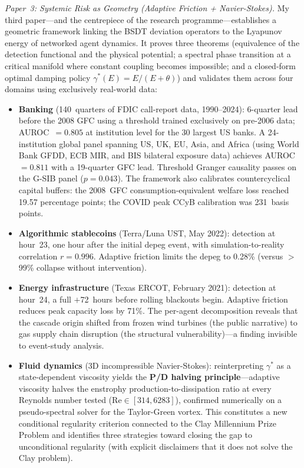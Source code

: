 \documentclass[12pt,a4paper]{article}
\begin{document}
\textit{Paper~3: Systemic Risk as Geometry (Adaptive Friction + Navier-Stokes).}\;
My third paper---and the centrepiece of the research programme---establishes
a geometric framework linking the BSDT deviation operators to the
Lyapunov energy of networked agent dynamics.  It proves three theorems
(equivalence of the detection functional and the physical potential;
a spectral phase transition at a critical manifold where constant
coupling becomes impossible; and a closed-form optimal damping policy
$\gamma^*(E) = E/(E+\theta)$) and validates them across four domains
using exclusively real-world data:

\begin{itemize}[nosep, leftmargin=2em]
  \item \textbf{Banking} (140~quarters of FDIC call-report data, 1990--2024):
    6-quarter lead before the 2008 GFC using a threshold trained
    exclusively on pre-2006 data; AUROC~$= 0.805$ at institution level
    for the 30 largest US banks.
    A 24-institution global panel spanning US, UK, EU, Asia, and Africa
    (using World Bank GFDD, ECB MIR, and BIS bilateral exposure data)
    achieves AUROC~$= 0.811$ with a 19-quarter GFC lead.  Threshold
    Granger causality passes on the G-SIB panel ($p = 0.043$).
    The framework also calibrates countercyclical capital buffers:
    the 2008~GFC consumption-equivalent welfare loss reached 19.57
    percentage points; the COVID peak CCyB calibration was 231~basis
    points.

  \item \textbf{Algorithmic stablecoins} (Terra/Luna UST, May 2022):
    detection at hour~23, one hour after the initial depeg event,
    with simulation-to-reality correlation $r = 0.996$.  Adaptive
    friction limits the depeg to 0.28\% (versus $>$99\% collapse
    without intervention).

  \item \textbf{Energy infrastructure} (Texas ERCOT, February 2021):
    detection at hour~24, a full $+$72~hours before rolling blackouts
    begin.  Adaptive friction reduces peak capacity loss by 71\%.
    The per-agent decomposition reveals that the cascade origin shifted
    from frozen wind turbines (the public narrative) to gas supply chain
    disruption (the structural vulnerability)---a finding invisible to
    event-study analysis.

  \item \textbf{Fluid dynamics} (3D incompressible Navier-Stokes):
    reinterpreting $\gamma^*$ as a state-dependent viscosity yields the
    \textbf{P/D halving principle}---adaptive viscosity halves the enstrophy
    production-to-dissipation ratio at every Reynolds number tested
    ($\mathrm{Re} \in [314, 6283]$), confirmed numerically on a
    pseudo-spectral solver for the Taylor-Green vortex.  This constitutes
    a new conditional regularity criterion connected to the Clay
    Millennium Prize Problem and identifies three strategies toward
    closing the gap to unconditional regularity (with explicit disclaimers
    that it does not solve the Clay problem).
\end{itemize}
\end{document}
